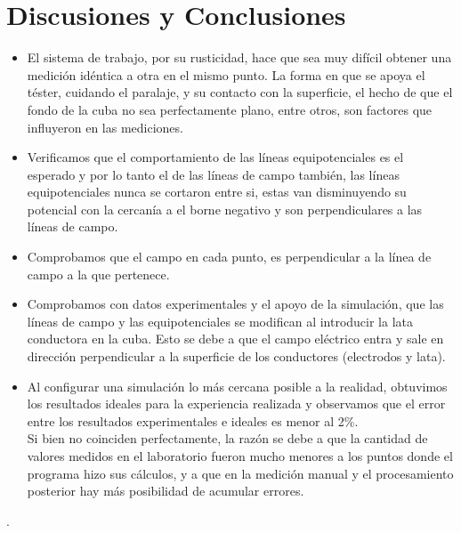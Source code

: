\documentclass{article}
\begin{document}
\section{Discusiones y Conclusiones}
\begin{itemize}
		\item El sistema de trabajo, por su rusticidad, hace que sea muy difícil obtener una medición idéntica a otra en el mismo punto. La forma en que se apoya el téster, cuidando el paralaje, y su contacto con la superficie, el hecho de que el fondo de la cuba no sea perfectamente plano, entre otros, son factores que influyeron en las mediciones.
		\item Verificamos que el comportamiento de las líneas equipotenciales es el esperado y por lo tanto el de las líneas de campo también, las líneas equipotenciales nunca se cortaron entre si, estas van disminuyendo su potencial con la cercanía a el borne negativo y son perpendiculares a las líneas de campo.
        \item Comprobamos que el campo en cada punto, es perpendicular a la línea de campo a la que pertenece.
        \item Comprobamos con datos experimentales y el apoyo de la simulación, que las líneas de campo y las equipotenciales se modifican al introducir la lata conductora en la cuba. Esto se debe a que el campo eléctrico entra y sale en dirección perpendicular a la superficie de los conductores (electrodos y lata).
        \item Al configurar una simulación lo más cercana posible a la realidad, obtuvimos los resultados ideales para la experiencia realizada y observamos que el error entre los resultados experimentales e ideales es menor al 2\%.\\
Si bien no coinciden perfectamente, la razón se debe a que la cantidad de valores medidos en el laboratorio fueron mucho menores a los puntos donde el programa hizo sus cálculos, y a que en la medición manual y el procesamiento posterior hay más posibilidad de acumular errores.
       
	\end{itemize}.
\end{document}

